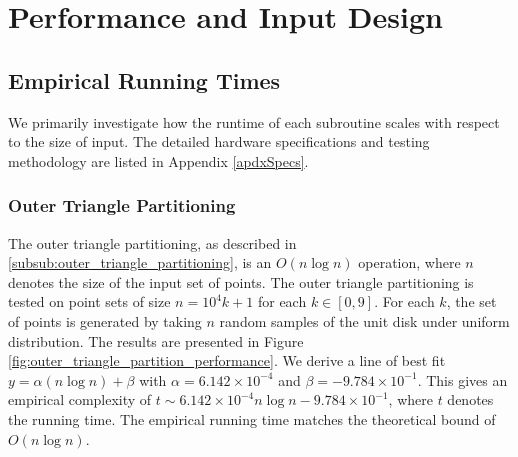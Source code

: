 \documentclass{article}
\newcommand{\figref}[1]{Figure \ref{#1}}
\newcommand{\apdxref}[1]{Appendix \ref{#1}}
\begin{document}
\section{Performance and Input Design}


\subsection{Empirical Running Times}

We primarily investigate how the runtime of each subroutine scales with respect to the size of input. The detailed hardware specifications and testing methodology are listed in \apdxref{apdxSpecs}.

\subsubsection{Outer Triangle Partitioning}

The outer triangle partitioning, as described in \ref{subsub:outer_triangle_partitioning}, is an $O(n \log n)$ operation, where $n$ denotes the size of the input set of points. The outer triangle partitioning is tested on point sets of size $n = 10^4 k + 1$ for each $k \in [0, 9]$. For each $k$, the set of points is generated by taking $n$ random samples of the unit disk under uniform distribution. The results are presented in \figref{fig:outer_triangle_partition_performance}. We derive a line of best fit $y = \alpha(n \log n) + \beta$ with $\alpha = 6.142 \times 10^{-4}$ and $\beta = -9.784 \times 10^{-1}$. This gives an empirical complexity of $t \sim 6.142 \times 10^{-4} n \log n -9.784 \times 10^{-1}$, where $t$ denotes the running time. The empirical running time matches the theoretical bound of $O(n \log n)$.
\end{document}
